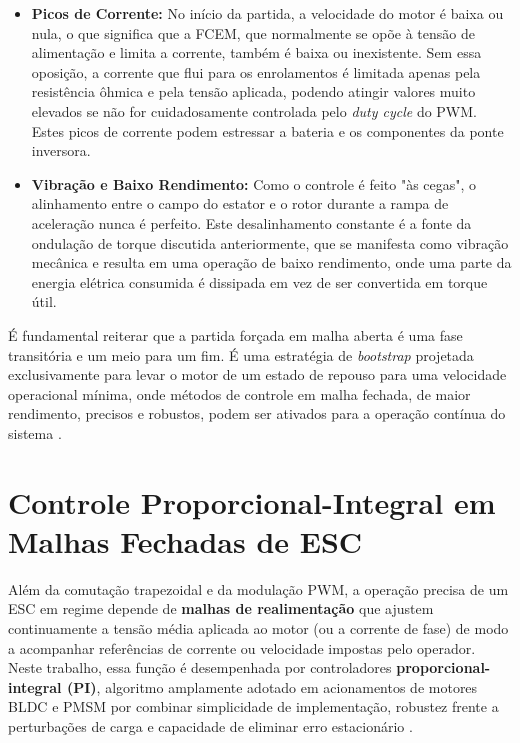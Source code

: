\begin{itemize}
    \item \textbf{Picos de Corrente:} No início da partida, a velocidade do motor é baixa ou nula, o que significa que a FCEM, que normalmente se opõe à tensão de alimentação e limita a corrente, também é baixa ou inexistente. Sem essa oposição, a corrente que flui para os enrolamentos é limitada apenas pela resistência ôhmica e pela tensão aplicada, podendo atingir valores muito elevados se não for cuidadosamente controlada pelo \textit{duty cycle} do PWM. Estes picos de corrente podem estressar a bateria e os componentes da ponte inversora.
    \item \textbf{Vibração e Baixo Rendimento:} Como o controle é feito "às cegas", o alinhamento entre o campo do estator e o rotor durante a rampa de aceleração nunca é perfeito. Este desalinhamento constante é a fonte da ondulação de torque discutida anteriormente, que se manifesta como vibração mecânica e resulta em uma operação de baixo rendimento, onde uma parte da energia elétrica consumida é dissipada em vez de ser convertida em torque útil.
\end{itemize}

É fundamental reiterar que a partida forçada em malha aberta é uma fase transitória e um meio para um fim. É uma estratégia de \textit{bootstrap} projetada exclusivamente para levar o motor de um estado de repouso para uma velocidade operacional mínima, onde métodos de controle em malha fechada, de maior rendimento, precisos e robustos, podem ser ativados para a operação contínua do sistema \cite{ti2022minimizing, nxp2023sensorless}.

\section{Controle Proporcional-Integral em Malhas Fechadas de ESC}
\label{sec:controle_pi}

Além da comutação trapezoidal e da modulação PWM, a operação precisa de um ESC em regime depende de \textbf{malhas de realimentação} que ajustem continuamente a tensão média aplicada ao motor (ou a corrente de fase) de modo a acompanhar referências de corrente ou velocidade impostas pelo operador. Neste trabalho, essa função é desempenhada por controladores \textbf{proporcional-integral (PI)}, algoritmo amplamente adotado em acionamentos de motores BLDC e PMSM por combinar simplicidade de implementação, robustez frente a perturbações de carga e capacidade de eliminar erro estacionário \cite{krishnan2010permanent, xia2012permanent, kim2017electric}.

